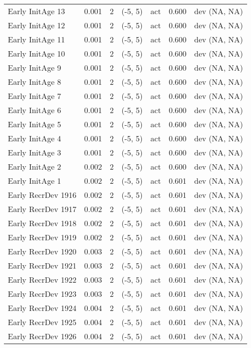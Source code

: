 \documentclass[11pt,
  english,
  letterpaper,
]{article}
\begin{document}
\begin{landscape}
\begin{longtable}[t]{>{\raggedright\arraybackslash}p{7.5cm}lllll>{\raggedright\arraybackslash}p{3.5cm}}
Early InitAge 13 & 0.001 & 2 & (-5, 5) & act & 0.600 & dev (NA, NA)\\
Early InitAge 12 & 0.001 & 2 & (-5, 5) & act & 0.600 & dev (NA, NA)\\
Early InitAge 11 & 0.001 & 2 & (-5, 5) & act & 0.600 & dev (NA, NA)\\
Early InitAge 10 & 0.001 & 2 & (-5, 5) & act & 0.600 & dev (NA, NA)\\
Early InitAge 9 & 0.001 & 2 & (-5, 5) & act & 0.600 & dev (NA, NA)\\
Early InitAge 8 & 0.001 & 2 & (-5, 5) & act & 0.600 & dev (NA, NA)\\
Early InitAge 7 & 0.001 & 2 & (-5, 5) & act & 0.600 & dev (NA, NA)\\
Early InitAge 6 & 0.001 & 2 & (-5, 5) & act & 0.600 & dev (NA, NA)\\
Early InitAge 5 & 0.001 & 2 & (-5, 5) & act & 0.600 & dev (NA, NA)\\
Early InitAge 4 & 0.001 & 2 & (-5, 5) & act & 0.600 & dev (NA, NA)\\
Early InitAge 3 & 0.001 & 2 & (-5, 5) & act & 0.600 & dev (NA, NA)\\
Early InitAge 2 & 0.002 & 2 & (-5, 5) & act & 0.600 & dev (NA, NA)\\
Early InitAge 1 & 0.002 & 2 & (-5, 5) & act & 0.601 & dev (NA, NA)\\
Early RecrDev 1916 & 0.002 & 2 & (-5, 5) & act & 0.601 & dev (NA, NA)\\
Early RecrDev 1917 & 0.002 & 2 & (-5, 5) & act & 0.601 & dev (NA, NA)\\
Early RecrDev 1918 & 0.002 & 2 & (-5, 5) & act & 0.601 & dev (NA, NA)\\
Early RecrDev 1919 & 0.002 & 2 & (-5, 5) & act & 0.601 & dev (NA, NA)\\
Early RecrDev 1920 & 0.003 & 2 & (-5, 5) & act & 0.601 & dev (NA, NA)\\
Early RecrDev 1921 & 0.003 & 2 & (-5, 5) & act & 0.601 & dev (NA, NA)\\
Early RecrDev 1922 & 0.003 & 2 & (-5, 5) & act & 0.601 & dev (NA, NA)\\
Early RecrDev 1923 & 0.003 & 2 & (-5, 5) & act & 0.601 & dev (NA, NA)\\
Early RecrDev 1924 & 0.004 & 2 & (-5, 5) & act & 0.601 & dev (NA, NA)\\
Early RecrDev 1925 & 0.004 & 2 & (-5, 5) & act & 0.601 & dev (NA, NA)\\
Early RecrDev 1926 & 0.004 & 2 & (-5, 5) & act & 0.601 & dev (NA, NA)\\

\end{longtable}
\end{landscape}
\end{document}
